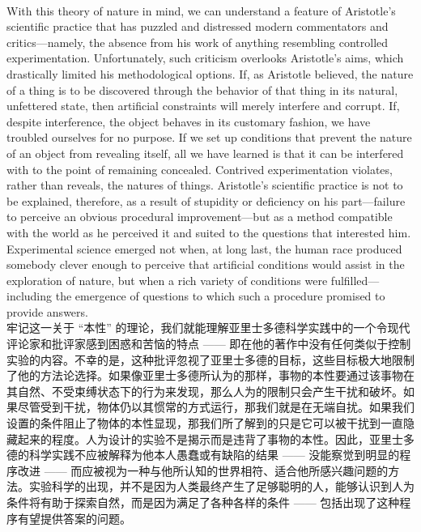 \documentclass{article}
\begin{document}
\\
With this theory of nature in mind, we can understand a feature of Aristotle’s scientific practice that has puzzled and distressed modern commentators and critics—namely, the absence from his work of anything resembling controlled experimentation. Unfortunately, such criticism overlooks Aristotle’s aims, which drastically limited his methodological options. If, as Aristotle believed, the nature of a thing is to be discovered through the behavior of that thing in its natural, unfettered state, then artificial constraints will merely interfere and corrupt. If, despite interference, the object behaves in its customary fashion, we have troubled ourselves for no purpose. If we set up conditions that prevent the nature of an object from revealing itself, all we have learned is that it can be interfered with to the point of remaining concealed. Contrived experimentation violates, rather than reveals, the natures of things. Aristotle’s scientific practice is not to be explained, therefore, as a result of stupidity or deficiency on his part—failure to perceive an obvious procedural improvement—but as a method compatible with the world as he perceived it and suited to the questions that interested him. Experimental science emerged not when, at long last, the human race produced somebody clever enough to perceive that artificial conditions would assist in the exploration of nature, but when a rich variety of conditions were fulfilled—including the emergence of questions to which such a procedure promised to provide answers.\\
牢记这一关于 “本性” 的理论，我们就能理解亚里士多德科学实践中的一个令现代评论家和批评家感到困惑和苦恼的特点 —— 即在他的著作中没有任何类似于控制实验的内容。不幸的是，这种批评忽视了亚里士多德的目标，这些目标极大地限制了他的方法论选择。如果像亚里士多德所认为的那样，事物的本性要通过该事物在其自然、不受束缚状态下的行为来发现，那么人为的限制只会产生干扰和破坏。如果尽管受到干扰，物体仍以其惯常的方式运行，那我们就是在无端自扰。如果我们设置的条件阻止了物体的本性显现，那我们所了解到的只是它可以被干扰到一直隐藏起来的程度。人为设计的实验不是揭示而是违背了事物的本性。因此，亚里士多德的科学实践不应被解释为他本人愚蠢或有缺陷的结果 —— 没能察觉到明显的程序改进 —— 而应被视为一种与他所认知的世界相符、适合他所感兴趣问题的方法。实验科学的出现，并不是因为人类最终产生了足够聪明的人，能够认识到人为条件将有助于探索自然，而是因为满足了各种各样的条件 —— 包括出现了这种程序有望提供答案的问题。\\
\end{document}
